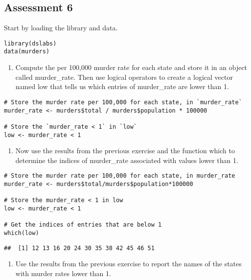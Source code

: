 \documentclass[
]{article}
\providecommand{\tightlist}{%
  \setlength{\itemsep}{0pt}\setlength{\parskip}{0pt}}
\begin{document}
\hypertarget{assessment-6}{%
\subsection{Assessment 6}\label{assessment-6}}

Start by loading the library and data.

\begin{verbatim}
library(dslabs)
data(murders)
\end{verbatim}

\begin{enumerate}
\def\labelenumi{\arabic{enumi}.}
\tightlist
\item
  Compute the per 100,000 murder rate for each state and store it in an
  object called murder\_rate. Then use logical operators to create a
  logical vector named low that tells us which entries of murder\_rate
  are lower than 1.
\end{enumerate}

\begin{verbatim}
# Store the murder rate per 100,000 for each state, in `murder_rate`
murder_rate <- murders$total / murders$population * 100000

# Store the `murder_rate < 1` in `low` 
low <- murder_rate < 1
\end{verbatim}

\begin{enumerate}
\def\labelenumi{\arabic{enumi}.}
\setcounter{enumi}{1}
\tightlist
\item
  Now use the results from the previous exercise and the function which
  to determine the indices of murder\_rate associated with values lower
  than 1.
\end{enumerate}

\begin{verbatim}
# Store the murder rate per 100,000 for each state, in murder_rate
murder_rate <- murders$total/murders$population*100000

# Store the murder_rate < 1 in low 
low <- murder_rate < 1

# Get the indices of entries that are below 1
which(low)
\end{verbatim}

\begin{verbatim}
##  [1] 12 13 16 20 24 30 35 38 42 45 46 51
\end{verbatim}

\begin{enumerate}
\def\labelenumi{\arabic{enumi}.}
\setcounter{enumi}{2}
\tightlist
\item
  Use the results from the previous exercise to report the names of the
  states with murder rates lower than 1.
\end{enumerate}
\end{document}
